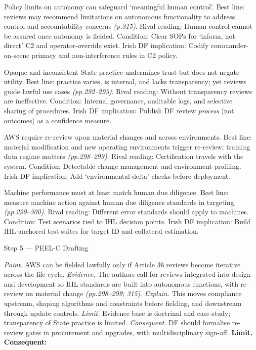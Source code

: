 Policy limits on autonomy can safeguard ‘meaningful human control’.
Best line: reviews may recommend limitations on autonomous functionality to address control and accountability concerns \emph{(p.315)}.
Rival reading: Human control cannot be assured once autonomy is fielded.
Condition: Clear SOPs for ‘inform, not direct’ C2 and operator-override exist.
Irish DF implication: Codify commander-on-scene primacy and non-interference rules in C2 policy.

Opaque and inconsistent State practice undermines trust but does not negate utility.
Best line: practice varies, is internal, and lacks transparency; yet reviews guide lawful use cases \emph{(pp.292–293)}.
Rival reading: Without transparency reviews are ineffective.
Condition: Internal governance, auditable logs, and selective sharing of procedures.
Irish DF implication: Publish DF review \emph{process} (not outcomes) as a confidence measure.

AWS require re-review upon material changes and across environments.
Best line: material modification and new operating environments trigger re-review; training data regime matters \emph{(pp.298–299)}.
Rival reading: Certification travels with the system.
Condition: Detectable change management and environment profiling.
Irish DF implication: Add ‘environmental delta’ checks before deployment.

Machine performance must at least match human due diligence.
Best line: measure machine action against human due diligence standards in targeting \emph{(pp.299–300)}.
Rival reading: Different error standards should apply to machines.
Condition: Test scenarios tied to IHL decision points.
Irish DF implication: Build IHL-anchored test suites for target ID and collateral estimation.

Step 5 — PEEL-C Drafting

\textit{Point.} AWS can be fielded lawfully only if Article 36 reviews become iterative across the life cycle.
\textit{Evidence.} The authors call for reviews integrated into design and development so IHL standards are built into autonomous functions, with re-review on material change \emph{(pp.298–299; 315)}.
\textit{Explain.} This moves compliance upstream, shaping algorithms and constraints before fielding, and downstream through update controls.
\textit{Limit.} Evidence base is doctrinal and case-study; transparency of State practice is limited.
\textit{Consequent.} DF should formalise re-review gates in procurement and upgrades, with multidisciplinary sign-off. \textbf{Limit. Consequent:}

